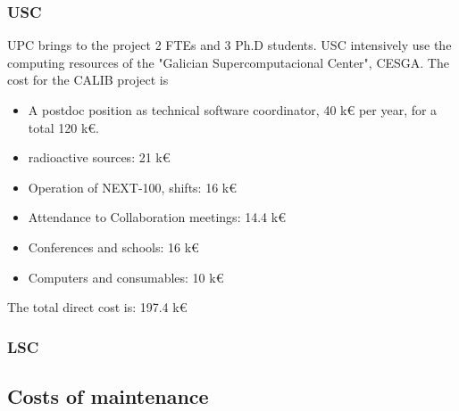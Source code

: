 \subsubsection{USC}
UPC brings to the project 2 FTEs and 3 Ph.D students. USC intensively use the computing resources of the "Galician Supercomputacional Center", CESGA. The cost for the CALIB project is

\begin{itemize}
    \item A postdoc position as technical software coordinator, 40 k€ per year, for a total 120 k€.
    \item radioactive sources: 21 k€
    \item Operation of NEXT-100, shifts: 16 k€
    \item Attendance to Collaboration meetings: 14.4 k€
    \item Conferences and schools:  16 k€
    \item Computers and consumables: 10 k€
\end{itemize}
The total direct cost is: 197.4 k€
\subsubsection{LSC}



\subsection{Costs of maintenance}

 
 